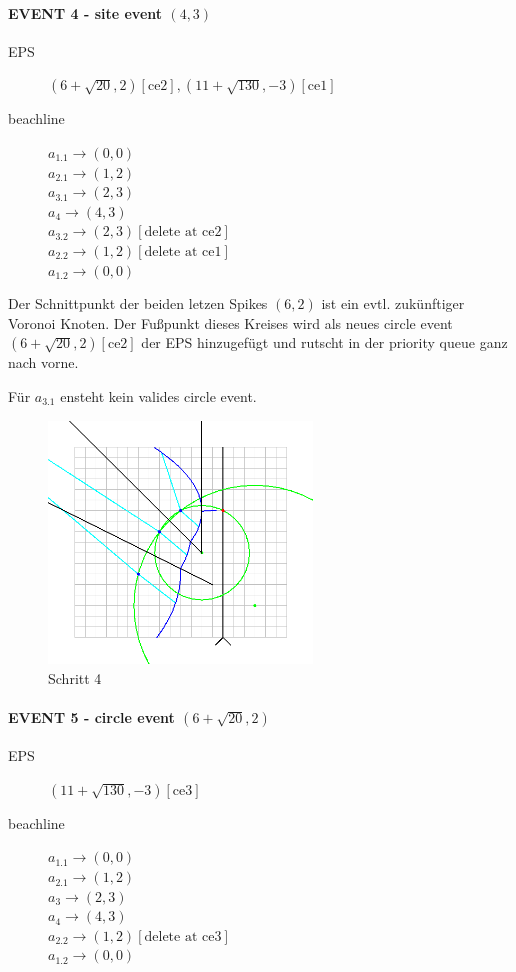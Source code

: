 \paragraph*{EVENT 4 - site event $(4,3)$}
\begin{description}
\item[EPS] $(6 + \sqrt{20}, 2)[\text{ce2}], (11 + \sqrt{130}, -3)[\text{ce1}]$
\item[beachline]
$a_{1.1} \rightarrow (0,0)$\\
$a_{2.1} \rightarrow (1,2)$\\
$a_{3.1} \rightarrow (2,3)$\\
$a_4 \rightarrow (4,3)$\\
$a_{3.2} \rightarrow (2,3)[\text{delete at ce2}]$\\
$a_{2.2} \rightarrow (1,2)[\text{delete at ce1}]$\\
$a_{1.2} \rightarrow (0,0)$
\end{description}

Der Schnittpunkt der beiden letzen Spikes $(6,2)$ ist ein evtl. zukünftiger Voronoi Knoten. Der Fußpunkt dieses Kreises wird als neues circle event  $(6 + \sqrt{20}, 2)[\text{ce2}]$ der EPS hinzugefügt und rutscht in der priority queue ganz nach vorne.

Für $a_{3.1}$ ensteht kein valides circle event.

\begin{figure}[h]
\begin{center}
\includegraphics[width=7cm]{capture4}
\end{center}
\caption{Schritt 4}
\label{fig:c4}
\end{figure}

\newpage

\paragraph*{EVENT 5 - circle event $(6 + \sqrt{20}, 2)$}
\begin{description}
\item[EPS] $(11 + \sqrt{130}, -3)[\text{ce3}]$
\item[beachline]
$a_{1.1} \rightarrow (0,0)$\\
$a_{2.1} \rightarrow (1,2)$\\
$a_{3} \rightarrow (2,3)$\\
$a_4 \rightarrow (4,3)$\\
$a_{2.2} \rightarrow (1,2)[\text{delete at ce3}]$\\
$a_{1.2} \rightarrow (0,0)$
\end{description}


